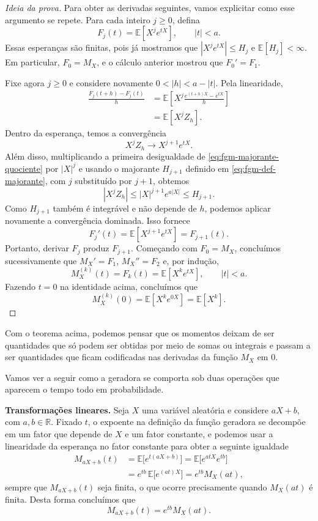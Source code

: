 \documentclass[12pt,portuguese]{article}
\theoremstyle{definition}
\theoremstyle{plainexercise}
\theoremstyle{starredexercise}
\theoremstyle{definition}
\begin{document}
\begin{proof}[Ideia da prova]
Para obter as derivadas seguintes, vamos explicitar como esse argumento
se repete. Para cada inteiro $j\geqslant0$, defina
\[
F_j(t)=\mathbb{E}[X^j e^{tX}],\qquad |t|<a.
\]
Essas esperanças são finitas, pois já mostramos que
$|X^j e^{tX}|\leqslant H_j$ e $\mathbb{E}[H_j]<\infty$.
Em particular, $F_0=M_X$, e o cálculo anterior mostrou que $F_0'=F_1$.

Fixe agora $j\geqslant0$ e considere novamente $0<|h|<a-|t|$.
Pela linearidade,
\begin{align*}
\frac{F_j(t+h)-F_j(t)}{h}
&=\mathbb{E}\left[
 X^j\frac{e^{(t+h)X}-e^{tX}}{h}\right]
\\[0.3cm]
&=\mathbb{E}[X^j Z_h].
\end{align*}
Dentro da esperança, temos a convergência
\[
X^j Z_h\longrightarrow X^{j+1}e^{tX}.
\]
Além disso, multiplicando a primeira desigualdade de
\eqref{eq:fgm-majorante-quociente} por $|X|^j$ e usando o majorante
$H_{j+1}$ definido em \eqref{eq:fgm-def-majorante}, com $j$ substituído
por $j+1$, obtemos
\[
|X^j Z_h|
\leqslant |X|^{j+1}e^{a|X|}
\leqslant H_{j+1}.
\]
Como $H_{j+1}$ também é integrável e não depende de $h$, podemos aplicar
novamente a convergência dominada. Isso fornece
\[
F_j'(t)=\mathbb{E}[X^{j+1}e^{tX}]=F_{j+1}(t).
\]
Portanto, derivar $F_j$ produz $F_{j+1}$. Começando com $F_0=M_X$,
concluímos sucessivamente que $M_X'=F_1$, $M_X''=F_2$ e, por indução,
\[
M_X^{(k)}(t)=F_k(t)=\mathbb{E}[X^k e^{tX}],\qquad |t|<a.
\]
Fazendo $t=0$ na identidade acima, concluímos que
\[
M_X^{(k)}(0)=\mathbb{E}[X^k e^{0X}]=\mathbb{E}[X^k].
\]
\end{proof}

Com o teorema acima, podemos pensar que os momentos deixam de ser quantidades 
que só podem ser obtidas por meio de somas ou integrais e passam a
ser quantidades que ficam codificadas nas derivadas da função $M_X$ em $0$. 

Vamos ver a seguir como a geradora se comporta sob duas
operações que aparecem o tempo todo em probabilidade.

\medskip
\noindent\textbf{Transformações lineares.}
Seja $X$ uma variável aleatória e considere $aX+b$, com $a,b\in\mathbb{R}$.
Fixado $t$, o expoente na definição da função geradora se decompõe em um fator que depende de $X$ e um fator
constante, e podemos usar a linearidade da esperança no fator constante
para obter a seguinte igualdade
\begin{align*}
M_{aX+b}(t)
&= \mathbb{E}\bigl[e^{t(aX+b)}\bigr]
= \mathbb{E}\bigl[e^{atX}e^{tb}\bigr]
\\[0.3cm]
&= e^{tb}\,\mathbb{E}\bigl[e^{(at)X}\bigr]
= e^{tb}M_X(at),
\end{align*}
sempre que $M_{aX+b}(t)$ seja finita, o que ocorre precisamente quando $M_X(at)$
é finita. Desta forma concluímos que
\begin{equation}\label{eq:fgm-linear}
M_{aX+b}(t) = e^{tb}M_X(at).
\end{equation}
\end{document}
